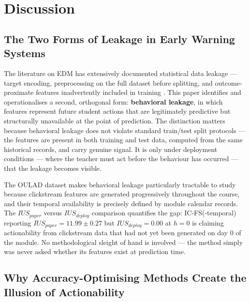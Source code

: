 \documentclass[a4paper,fleqn]{cas-sc}
\begin{document}

\section{Discussion}
\label{sec:discussion}

\subsection{The Two Forms of Leakage in Early Warning Systems}

The literature on EDM has extensively documented statistical data leakage --- target encoding, preprocessing on the full dataset before splitting, and outcome-proximate features inadvertently included in training \cite{kaufman2012, kapoor2023, baker2014}. This paper identifies and operationalises a second, orthogonal form: \textbf{behavioral leakage}, in which features represent future student actions that are legitimately predictive but structurally unavailable at the point of prediction. The distinction matters because behavioral leakage does not violate standard train/test split protocols --- the features are present in both training and test data, computed from the same historical records, and carry genuine signal. It is only under deployment conditions --- where the teacher must act before the behaviour has occurred --- that the leakage becomes visible.

The OULAD dataset makes behavioral leakage particularly tractable to study because clickstream features are generated progressively throughout the course, and their temporal availability is precisely defined by module calendar records. The $IUS_{paper}$ versus $IUS_{deploy}$ comparison quantifies the gap: IC-FS(-temporal) reporting $IUS_{paper} = 11.99 \pm 0.27$ but $IUS_{deploy} = 0.00$ at $h=0$ is claiming actionability from clickstream data that had not yet been generated on day 0 of the module. No methodological sleight of hand is involved --- the method simply was never asked whether its features exist at prediction time.

\subsection{Why Accuracy-Optimising Methods Create the Illusion of Actionability}
\end{document}

